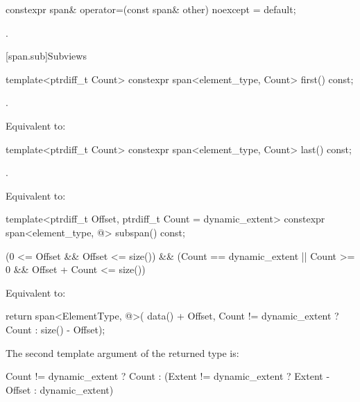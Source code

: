 \begin{codeblock}
\begin{codeblock}
\begin{codeblock}
%
\begin{itemdecl}
constexpr span& operator=(const span& other) noexcept = default;
\end{itemdecl}
\begin{itemdescr}
\pnum
\postconditions
{}.
\end{itemdescr}

[span.sub]{Subviews}

%
\begin{itemdecl}
template<ptrdiff_t Count> constexpr span<element_type, Count> first() const;
\end{itemdecl}
\begin{itemdescr}
\pnum
\requires
{}.

\pnum
\effects
Equivalent to: 
\end{itemdescr}

%
\begin{itemdecl}
template<ptrdiff_t Count> constexpr span<element_type, Count> last() const;
\end{itemdecl}
\begin{itemdescr}
\pnum
\requires
{}.

\pnum
\effects
Equivalent to: 
\end{itemdescr}

%
\begin{itemdecl}
template<ptrdiff_t Offset, ptrdiff_t Count = dynamic_extent>
  constexpr span<element_type, @\seebelow@> subspan() const;
\end{itemdecl}
\begin{itemdescr}
\pnum
\requires
\begin{codeblock}
(0 <= Offset && Offset <= size())
&& (Count == dynamic_extent || Count >= 0 && Offset + Count <= size())
\end{codeblock}

\pnum
\effects
Equivalent to:
\begin{codeblock}
return span<ElementType, @\seebelow@>(
  data() + Offset, Count != dynamic_extent ? Count : size() - Offset);
\end{codeblock}

\pnum
\remarks
The second template argument of the returned  type is:
\begin{codeblock}
Count != dynamic_extent ? Count
                        : (Extent != dynamic_extent ? Extent - Offset
                                                    : dynamic_extent)
\end{codeblock}
\end{itemdescr}


\end{codeblock}
\end{codeblock}
\end{codeblock}
